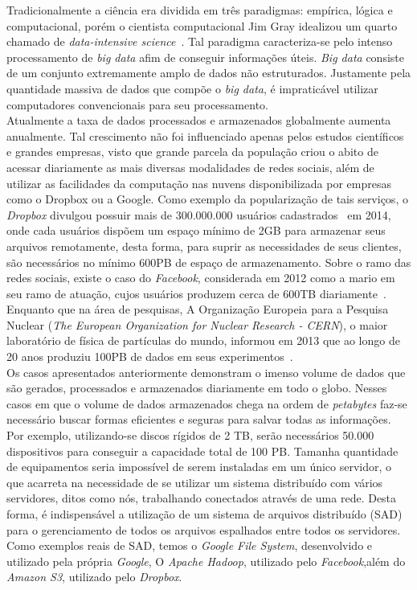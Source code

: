 
	Tradicionalmente a ciência era dividida em três paradigmas: empírica, lógica e computacional, porém o cientista computacional Jim Gray idealizou um quarto chamado de \textit{data-intensive science}~\cite{hey2009}. Tal paradigma caracteriza-se pelo intenso processamento de \textit{big data} afim de conseguir informações úteis. \textit{Big data} consiste de um conjunto extremamente amplo de dados não estruturados. Justamente pela quantidade massiva de dados que compõe o \textit{big data}, é impraticável utilizar computadores convencionais para seu processamento.
	\\
	
	Atualmente a taxa de dados processados e armazenados globalmente aumenta anualmente. Tal crescimento não foi influenciado apenas pelos estudos científicos e grandes empresas, visto que grande parcela da população criou o abito de acessar diariamente as mais diversas modalidades de redes sociais, além de utilizar as facilidades da computação nas nuvens disponibilizada por empresas como o Dropbox ou a Google. Como exemplo da popularização de tais serviços, o \textit{Dropbox} divulgou possuir mais de 300.000.000 usuários cadastrados~\cite{dropbox} em 2014, onde cada usuários dispõem um espaço mínimo de 2GB para armazenar seus arquivos remotamente, desta forma, para suprir as necessidades de seus clientes, são necessários no mínimo 600PB de espaço de armazenamento. Sobre o ramo das redes sociais, existe o caso do \textit{Facebook}, considerada em 2012 como a mario em seu ramo de atuação, cujos usuários produzem cerca de 600TB diariamente~\cite{facebook14}. Enquanto que na área de pesquisas, A Organização Europeia para a Pesquisa Nuclear (\textit{The European Organization for Nuclear Research - CERN}), o maior laboratório de física de partículas do mundo, informou em 2013 que ao longo de 20 anos produziu 100PB de dados em seus experimentos~\cite{cern}.
	\\
	
	Os casos apresentados anteriormente demonstram o imenso volume de dados que são gerados, processados e armazenados diariamente em todo o globo. Nesses casos em que o volume de dados armazenados chega na ordem de \textit{petabytes} faz-se necessário buscar formas eficientes e seguras para salvar todas as informações. Por exemplo, utilizando-se discos rígidos de 2 TB, serão necessários 50.000 dispositivos para conseguir a capacidade total de 100 PB. Tamanha quantidade de equipamentos seria impossível de serem instaladas em um único servidor, o que acarreta na necessidade de se utilizar um sistema distribuído com vários servidores, ditos como nós, trabalhando conectados através de uma rede. Desta forma, é indispensável a utilização de um sistema de arquivos distribuído (SAD) para o gerenciamento de todos os arquivos espalhados entre todos os servidores. Como exemplos reais de SAD, temos  o \textit{Google File System}, desenvolvido e utilizado pela própria \textit{Google}, O \textit{Apache Hadoop}, utilizado pelo \textit{Facebook},além do \textit{Amazon S3}, utilizado pelo \textit{Dropbox}.
	\\
	
